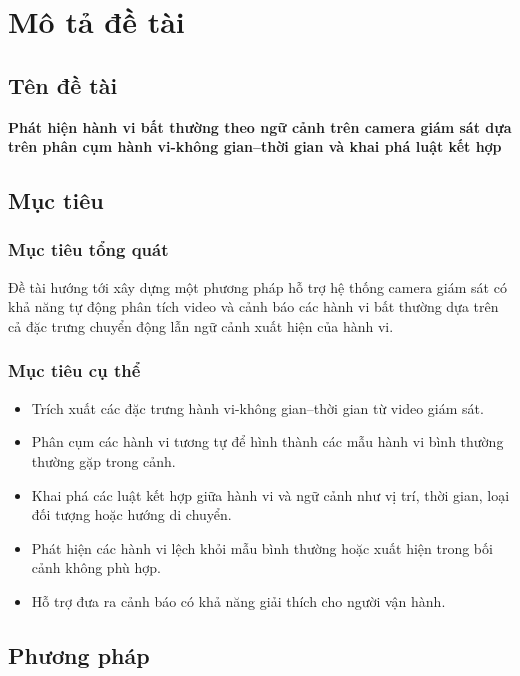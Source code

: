 \chapter{Mô tả đề tài}

\section{Tên đề tài}

\textbf{Phát hiện hành vi bất thường theo ngữ cảnh trên camera giám sát dựa trên phân cụm hành vi-không gian--thời gian và khai phá luật kết hợp}

\section{Mục tiêu}

\subsection{Mục tiêu tổng quát}

Đề tài hướng tới xây dựng một phương pháp hỗ trợ hệ thống camera giám sát có khả năng tự động phân tích video và cảnh báo các hành vi bất thường dựa trên cả đặc trưng chuyển động lẫn ngữ cảnh xuất hiện của hành vi.

\subsection{Mục tiêu cụ thể}

\begin{itemize}
    \item Trích xuất các đặc trưng hành vi-không gian--thời gian từ video giám sát.
    \item Phân cụm các hành vi tương tự để hình thành các mẫu hành vi bình thường thường gặp trong cảnh.
    \item Khai phá các luật kết hợp giữa hành vi và ngữ cảnh như vị trí, thời gian, loại đối tượng hoặc hướng di chuyển.
    \item Phát hiện các hành vi lệch khỏi mẫu bình thường hoặc xuất hiện trong bối cảnh không phù hợp.
    \item Hỗ trợ đưa ra cảnh báo có khả năng giải thích cho người vận hành.
\end{itemize}

\section{Phương pháp}

